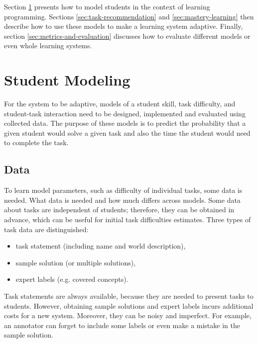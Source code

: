 Section \ref{sec:student-modeling} presents how to model students
  in the context of learning programming.
Sections \ref{sec:task-recommendation} and \ref{sec:mastery-learning}
  then describe how to use these models to make a learning system adaptive.
Finally, section \ref{sec:metrics-and-evaluation} discusses how to evaluate
  different models or even whole learning systems.


\section{Student Modeling}
\label{sec:student-modeling}

For the system to be adaptive, models of
  a student skill, task difficulty, and student-task interaction
  need to be designed, implemented and evaluated using collected data.
The purpose of these models is to predict the probability that a given student
  would solve a given task
  and also the time the student would need to complete the task.


\subsection{Data}
\label{sec:student-modeling.data}

To learn model parameters, such as difficulty of individual tasks, some data is needed.
What data is needed and how much differs across models.
Some data about tasks are independent of students;
therefore, they can be obtained in advance,
which can be useful for initial task difficulties estimates.
Three types of task data are distinguished:

\begin{itemize}
  \item task statement (including name and world description),
  \item sample solution (or multiple solutions),
  \item expert labels (e.g. covered concepts).
\end{itemize}

Task statements are always available,
  because they are needed to present tasks to students.
However, obtaining sample solutions and expert labels
  incurs additional costs for a new system.
Moreover, they can be noisy and imperfect.
For example, an annotator can forget to include some labels
  or even make a mistake in the sample solution.

